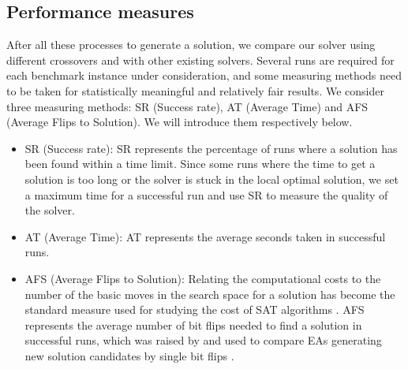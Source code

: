 	\subsection{Performance measures}
	After all these processes to generate a solution, we compare our solver using
	different crossovers and with other existing solvers. Several runs are
	required for each benchmark instance under consideration, and some measuring
	methods need to be taken for statistically meaningful and relatively fair
	results. We consider three measuring methods: SR (Success
	rate), AT (Average Time) and AFS (Average Flips to Solution). We will
	introduce them respectively below.
	
	\begin{itemize}
		\item
		      SR (Success rate): SR represents the percentage of runs where a solution has
		      been found within a time limit. Since some runs where the time to get a
		      solution is too long or the solver is stuck in the local optimal solution, we
		      set a maximum time for a successful run and use SR to measure the quality of the solver. 
		\item
		      AT (Average Time): AT represents the average seconds taken in successful runs.
		\item
		      AFS (Average Flips to Solution): Relating the computational costs to the
		      number of the basic moves in the search space for a solution has become the
		      standard measure used for studying the cost of SAT algorithms
		      \parencite{Singer2000}. AFS represents the average number of bit flips needed
		      to find a solution in successful runs, which was raised by
		      \citeauthor{Voss} and used to compare EAs generating new solution
		      candidates by single bit flips \parencite{Voss}.
	\end{itemize}
